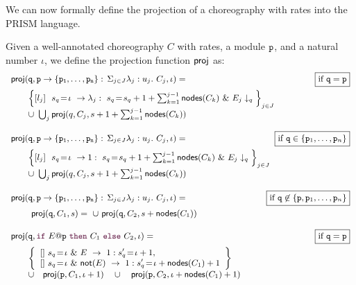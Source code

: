     We can now formally define the projection of a choreography with
    rates into the PRISM language.
    \begin{definition}\label{def:projCTMC} Given a
      well-annotated choreography $C$ with
      rates, a module $\mathtt{p}$, and a natural number $\iota$, we
      define the projection function $\mathsf{proj}$ as:
      \begin{displaymath}\small
        \begin{array}{lr}

          \proj (\role q,\interact{p}{\role p_1,\ldots,\role p_n}, \iota)= 
          &  \boxed{\text{if }\role q=\role p}\\[2mm]
          \qquad
          \Big\{\commandBase {l_j} {\ s_{q}\!=\! \iota} {\lambda_j:\ s_{q}\!=\!
          s_{q} +1+\sum_{k=1}^{j-1}\mathsf{nodes}({C_k})}\ \&\ \projE
          {E_j}q\Big\}_{j\in J}
          \\
          \qquad\cup\ \bigcup_{j} \proj (q, C_j, s+1+\sum_{k=1}^{j-1}\mathsf{nodes}({C_k}))
          \\\\

          \proj (\role q,\interact{p}{\role p_1,\ldots,\role p_n}, \iota)= 
          &  \!\!\!\!\!\! \!\!\!\!\!\!\boxed{\text{if }\role q\in\{\role p_1,\ldots,\role p_n\}}\\[2mm]
          \qquad
          \Big\{\commandBase {l_j} {\ s_{q}\!=\! \iota} {1:\ s_{q}\!=\!
          s_{q} +1+\sum_{k=1}^{j-1}\mathsf{nodes}({C_k})}\ \&\ \projE
          {E_j}q\Big\}_{j\in J}
          \\
          \qquad\cup\ \bigcup_{j} \proj (q, C_j, s+1+\sum_{k=1}^{j-1}\mathsf{nodes}({C_k}))
          \\\\

          \proj (\role q,\interact{p}{\role p_1,\ldots,\role p_n}, \iota)= 
          &  \!\!\!\!\!\! \!\!\!\!\!\!\boxed{\text{if }\role q\not\in\{\role p, 
            \role p_1,\ldots,\role p_n\}}\\[2mm]
          \qquad\ \proj (\role{q}, C_1, s)=
          \ \cup\
          \proj (\role{q}, C_2, s+\mathsf{nodes}(C_1))
          \\\\

          \proj (\role q,\ifTE {E}{p}{C_1}{C_2}, \iota) = 
          &  \boxed{\text{if }\role q=\role p}\\[2mm]
          \qquad\left\{ 
          \begin{array}{lll}
            \commandBase {} {s_{q}\!=\! \iota\ \&\ E}{\ 1: s'_{q}\!=\! \iota+1},\\ 
            \commandBase {} {s_{q}\!=\! \iota\ \&\ \mathsf{not}(E)}
            {\ 1: s'_{q}\!=\! \iota+\mathsf{nodes}(C_1)+1}
          \end{array}
          \right\}
          \\
          \qquad\cup\quad \proj (\role{p}, C_1, \iota+1)
          \quad\cup\quad
          \proj (\role{p}, C_2, \iota+\mathsf{nodes}(C_1)+1)
          \\\\


\end{array}
\end{displaymath}
\end{definition}
